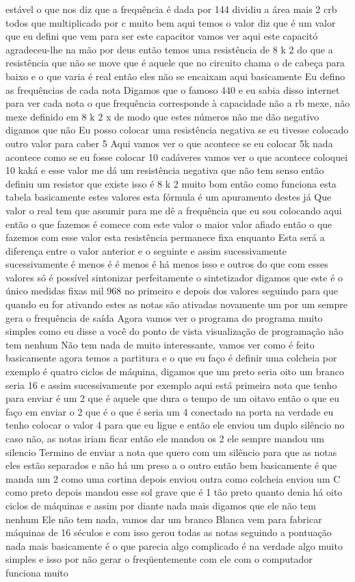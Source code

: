 \documentclass[oneside,11pt]{memoir} %
\begin{document}
estável  o que nos diz que a frequência é dada  por 144 dividiu a área mais 2 crb todos  que multiplicado por c  muito bem aqui temos o valor diz que  é um valor que eu defini que vem para  ser este capacitor vamos ver aqui  este capacitó agradeceu-lhe na mão por  deus então temos uma resistência de  8 k 2 do que a resistência que não se move  que é aquele que no circuito chama o  de cabeça para baixo e o que varia é real  então eles não se encaixam aqui basicamente  Eu defino as frequências de cada nota  Digamos que o famoso 440 e eu sabia disso  internet para ver cada nota o que  frequência corresponde à capacidade não  a rb mexe, não mexe  definido em 8 k 2 x de modo que estes  números não me dão negativo digamos que não  Eu posso colocar uma resistência negativa  se eu tivesse colocado outro valor para caber 5  Aqui vamos ver o que acontece se eu colocar 5k  nada acontece como se eu fosse colocar 10 cadáveres  vamos ver o que acontece  coloquei 10 kaká e esse valor me dá um  resistência negativa que não tem  senso  então definiu um resistor que  existe isso é  8 k 2 muito bom então como funciona  esta tabela basicamente estes valores  esta fórmula é um apuramento destes já  Que valor o real tem que assumir para  me dê a frequência que eu sou  colocando aqui então o que fazemos é  comece com este valor o maior valor  afiado  então o que fazemos com esse valor  esta resistência permanece fixa enquanto  Esta será a diferença entre o  valor anterior e o seguinte e assim sucessivamente  sucessivamente é menos é  é menos é  há menos isso e outros do que com  esses valores  só é possível sintonizar perfeitamente o  sintetizador digamos que este é o único  medidas fixas mil 968  no primeiro e depois dos valores  seguindo para que quando eu for  ativando estes as notas são ativadas novamente  um por um sempre gera o  frequência de saída  Agora vamos ver o programa do programa  muito simples como eu disse a você do ponto de vista  visualização de programação não tem nenhum  Não tem nada de muito interessante, vamos ver  como é feito basicamente  agora temos a partitura  e o que eu faço é definir  uma colcheia por exemplo é quatro  ciclos de máquina, digamos que um preto seria  oito um branco seria 16 e assim  sucessivamente por exemplo aqui está  primeira nota que tenho para enviar é um  2 que é aquele que dura o tempo de um  oitavo então o que eu faço em enviar  o 2 que é o que é seria um 4  conectado na porta na verdade eu tenho  colocar o valor 4 para que eu ligue  e então ele enviou um duplo silêncio no caso  não, as notas iriam ficar então  ele mandou os 2 ele sempre mandou um silencio  Termino de enviar a nota que quero  com um silêncio para que as notas  eles estão separados e não há um preso a  o outro então bem basicamente é  que manda um 2 como uma cortina depois  enviou outra como colcheia enviou um C como  preto depois mandou esse sol grave que  é 1 tão preto quanto denia há oito  ciclos de máquinas e assim por diante nada  mais digamos que ele não tem nenhum  Ele não tem nada, vamos dar um branco  Blanca vem para fabricar máquinas de 16 séculos  e com isso gerou todas as notas  seguindo a pontuação  nada mais basicamente é o que parecia  algo complicado é na verdade algo muito  simples e isso por não gerar o  freqüentemente com ele com o computador  funciona muito 
\end{document}
